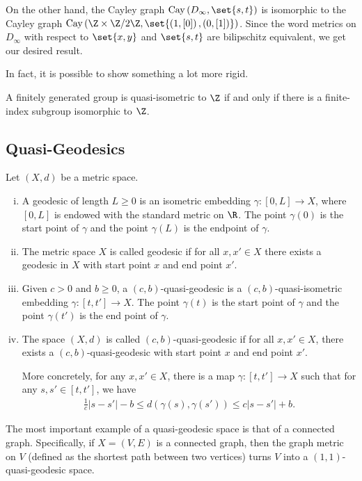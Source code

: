 \documentclass[10pt]{mypackage}
\begin{document}
On the other hand, the Cayley graph $\operatorname{Cay}\left( D_{\infty},\set{s,t} \right)$ is isomorphic to the Cayley graph $\operatorname{Cay}\left( \Z\times \Z/2\Z,\set{\left( 1,[0] \right),\left( 0,[1] \right)} \right)$. Since the word metrics on $D_{\infty}$ with respect to $\set{x,y}$ and $\set{s,t}$ are bilipschitz equivalent, we get our desired result.

In fact, it is possible to show something a lot more rigid.
\begin{theorem}
  A finitely generated group is quasi-isometric to $\Z$ if and only if there is a finite-index subgroup isomorphic to $\Z$.
\end{theorem}
\subsection{Quasi-Geodesics}%
\begin{definition}
  Let $\left( X,d \right)$ be a metric space.
  \begin{enumerate}[(i)]
    \item A geodesic of length $L\geq 0$ is an isometric embedding $\gamma\colon [0,L]\rightarrow X$, where $[0,L]$ is endowed with the standard metric on $\R$. The point $\gamma(0)$ is the start point of $\gamma$ and the point $\gamma(L)$ is the endpoint of $\gamma$.
    \item The metric space $X$ is called geodesic if for all $x,x'\in X$ there exists a geodesic in $X$ with start point $x$ and end point $x'$.
    \item Given $c > 0$ and $b\geq 0$, a $\left( c,b \right)$-quasi-geodesic is a $\left( c,b \right)$-quasi-isometric embedding $\gamma\colon [t,t']\rightarrow X$. The point $\gamma(t)$ is the start point of $\gamma$ and the point $\gamma(t')$ is the end point of $\gamma$.
    \item The space $\left( X,d \right)$ is called $\left( c,b \right)$-quasi-geodesic if for all $x,x'\in X$, there exists a $\left( c,b \right)$-quasi-geodesic with start point $x$ and end point $x'$.

      More concretely, for any $x,x'\in X$, there is a map $\gamma\colon [t,t']\rightarrow X$ such that for any $s,s'\in [t,t']$, we have
      \begin{align*}
        \frac{1}{c}\left\vert s-s' \right\vert - b \leq d\left( \gamma(s),\gamma(s') \right) \leq c\left\vert s-s' \right\vert + b.
      \end{align*}
  \end{enumerate}
\end{definition}
The most important example of a quasi-geodesic space is that of a connected graph. Specifically, if $X = \left( V,E \right)$ is a connected graph, then the graph metric on $V$ (defined as the shortest path between two vertices) turns $V$ into a $\left( 1,1 \right)$-quasi-geodesic space.
\end{document}
